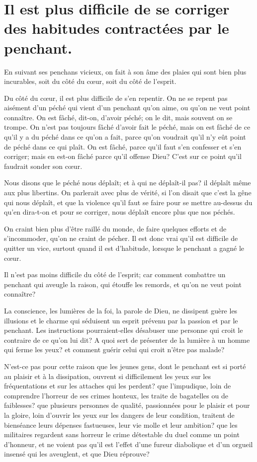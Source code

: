 \documentclass[instructions.tex]{subfiles}
\begin{document}
\chapter{Il est plus difficile de se corriger des habitudes contractées par le penchant.}


En suivant ses penchans vicieux, on fait à son âme des plaies qui sont bien plus incurables, soit du côté du cœur, soit du côté de l'esprit.

\primo Du côté du cœur, il est plus difficile de s'en repentir. On ne se repent pas aisément d'un péché qui vient d'un penchant qu'on aime, ou qu'on ne veut point connaître. On est fâché, dit-on, d'avoir péché; on le dit, mais souvent on se trompe. On n'est pas toujours fâché d'avoir fait le péché, mais on est fâché de ce qu'il y a du péché dans ce qu'on a fait, parce qu'on voudrait qu'il n'y eût point de péché dans ce qui plaît. On est fâché, parce qu'il faut s'en confesser et s'en corriger; mais en est-on fâché parce qu'il offense Dieu? C'est sur ce point qu'il faudrait sonder son cœur.

Nous disons que le péché nous déplaît; et à qui ne déplaît-il pas? il déplaît même aux plus libertins. On parlerait avec plus de vérité, si l'on disait que c'est la gêne qui nous déplaît, et que la violence qu'il faut se faire pour se mettre au-dessus du qu'en dira-t-on et pour se corriger, nous déplaît encore plus que nos péchés.

On craint bien plus d'être raillé du monde, de faire quelques efforts et de s'incommoder, qu'on ne craint de pécher. Il est donc vrai qu'il est difficile de quitter un vice, surtout quand il est d'habitude, lorsque le penchant a gagné le cœur.

\secundo Il n'est pas moins difficile du côté de l'esprit; car comment combattre un penchant qui aveugle la raison, qui étouffe les remords, et qu'on ne veut point connaître?

La conscience, les lumières de la foi, la parole de Dieu, ne dissipent guère les illusions et le charme qui séduisent un esprit prévenu par la passion et par le penchant. Les instructions pourraient-elles désabuser une personne qui croit le contraire de ce qu'on lui dit? A quoi sert de présenter de la lumière à un homme qui ferme les yeux? et comment guérir celui qui croit n'être pas malade?

N'est-ce pas pour cette raison que les jeunes gens, dont le penchant est si porté au plaisir et à la dissipation, ouvrent si difficilement les yeux sur les fréquentations et sur les attaches qui les perdent? que l'impudique, loin de comprendre l'horreur de ses crimes honteux, les traite de bagatelles ou de faiblesses? que plusieurs personnes de qualité, passionnées pour le plaisir et pour la gloire, loin d'ouvrir les yeux sur les dangers de leur condition, traitent de bienséance leurs dépenses fastueuses, leur vie molle et leur ambition? que les militaires regardent sans horreur le crime détestable du duel comme un point d'honneur, et ne voient pas qu'il est l'effet d'une fureur diabolique et d'un orgueil insensé qui les aveuglent, et que Dieu réprouve?
\end{document}
